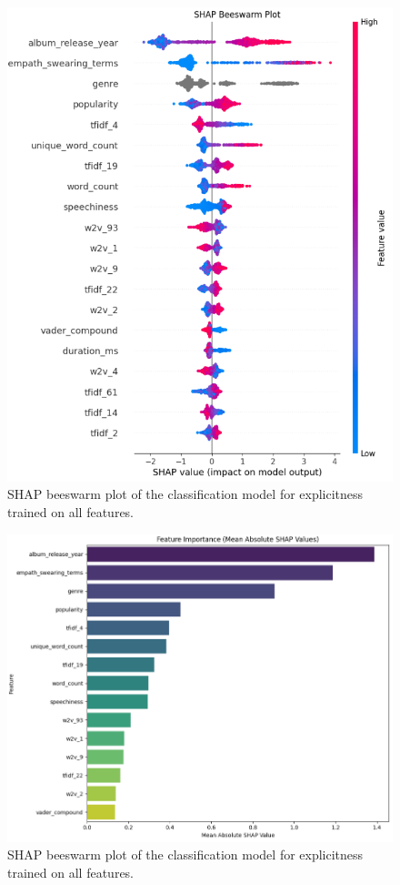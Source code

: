 \begin{center}
\begin{figure}[H]
  \centering
  \includegraphics[width=5in]{img/beeswarm_explicitness.png}
  \caption{SHAP beeswarm plot of the classification model for explicitness trained on all features.}
  \label{Figure:fig_beh}
\end{figure}
\end{center}

\begin{center}
\begin{figure}[H]
  \centering
  \includegraphics[width=5in]{img/feature_importance_explicitness.png}
  \caption{SHAP beeswarm plot of the classification model for explicitness  trained on all features.}
  \label{Figure:fig_beh}
\end{figure}
\end{center}


